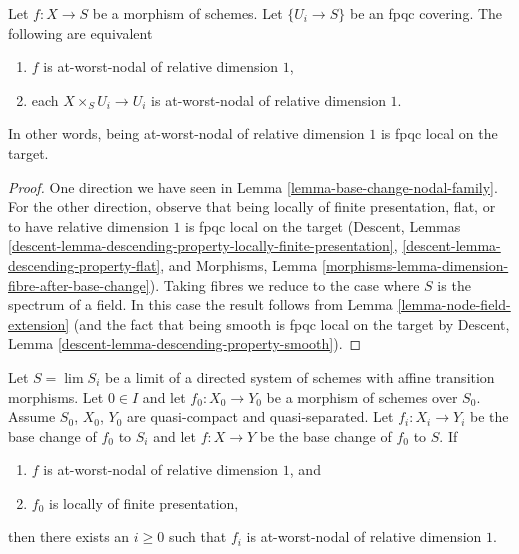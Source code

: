 \begin{lemma}
\label{lemma-nodal-family-fpqc-local-target}
Let $f : X \to S$ be a morphism of schemes. Let $\{U_i \to S\}$
be an fpqc covering. The following are equivalent
\begin{enumerate}
\item $f$ is at-worst-nodal of relative dimension $1$,
\item each $X \times_S U_i \to U_i$ is at-worst-nodal of relative
dimension $1$.
\end{enumerate}
In other words, being at-worst-nodal of relative dimension $1$
is fpqc local on the target.
\end{lemma}

\begin{proof}
One direction we have seen in Lemma \ref{lemma-base-change-nodal-family}.
For the other direction, observe that being locally of finite
presentation, flat, or to have relative dimension $1$
is fpqc local on the target
(Descent, Lemmas
\ref{descent-lemma-descending-property-locally-finite-presentation},
\ref{descent-lemma-descending-property-flat}, and
Morphisms, Lemma \ref{morphisms-lemma-dimension-fibre-after-base-change}).
Taking fibres we reduce
to the case where $S$ is the spectrum of a field. In this case the
result follows from Lemma \ref{lemma-node-field-extension}
(and the fact that being smooth is fpqc local on the target by
Descent, Lemma \ref{descent-lemma-descending-property-smooth}).
\end{proof}

\begin{lemma}
\label{lemma-descend-nodal-family}
Let $S = \lim S_i$ be a limit of a directed system of schemes
with affine transition morphisms.
Let $0 \in I$ and let $f_0 : X_0 \to Y_0$ be a morphism of schemes over $S_0$.
Assume $S_0$, $X_0$, $Y_0$ are quasi-compact and quasi-separated.
Let $f_i : X_i \to Y_i$ be the base change of $f_0$ to $S_i$ and
let $f : X \to Y$ be the base change of $f_0$ to $S$.
If
\begin{enumerate}
\item $f$ is at-worst-nodal of relative dimension $1$, and
\item $f_0$ is locally of finite presentation,
\end{enumerate}
then there exists an $i \geq 0$ such that $f_i$ is at-worst-nodal
of relative dimension $1$.
\end{lemma}

